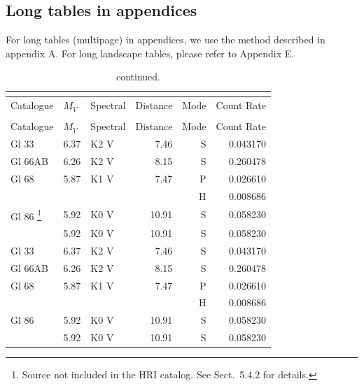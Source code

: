 \documentclass{aa}
\begin{document}
\begin{appendix}
	\FloatBarrier %
	\twocolumn
	\onecolumn
	\section{Long tables in appendices}
	For long tables (multipage) in appendices, we use the method described in appendix A.
	For long landscape tables, please refer to Appendix E.
	\begin{longtable}{lllrrr}

		\caption{A long table}                                        \\
		\label{ltapp}                                                 \\
		\hline\hline
		Catalogue & $M_{V}$ & Spectral & Distance & Mode & Count Rate \\
		\hline
		\endfirsthead
		\caption{continued.}                                          \\
		\hline
		Catalogue & $M_{V}$ & Spectral & Distance & Mode & Count Rate \\
		\hline
		\endhead
		\hline
		\endfoot
		Gl 33     & 6.37    & K2 V     & 7.46     & S    & 0.043170   \\
		Gl 66AB   & 6.26    & K2 V     & 8.15     & S    & 0.260478   \\
		Gl 68     & 5.87    & K1 V     & 7.47     & P    & 0.026610   \\
		          &         &          &          & H    & 0.008686   \\
		Gl 86
		\footnote{Source not included in the HRI catalog. See Sect.~5.4.2 for details.}
		          & 5.92    & K0 V     & 10.91    & S    & 0.058230   \\
		          & 5.92    & K0 V     & 10.91    & S    & 0.058230   \\
		Gl 33     & 6.37    & K2 V     & 7.46     & S    & 0.043170   \\
		Gl 66AB   & 6.26    & K2 V     & 8.15     & S    & 0.260478   \\
		Gl 68     & 5.87    & K1 V     & 7.47     & P    & 0.026610   \\
		          &         &          &          & H    & 0.008686   \\
		Gl 86     & 5.92    & K0 V     & 10.91    & S    & 0.058230   \\            & 5.92 & K0 V & 10.91& S & 0.058230\\

\end{longtable}
\end{appendix}
\end{document}

